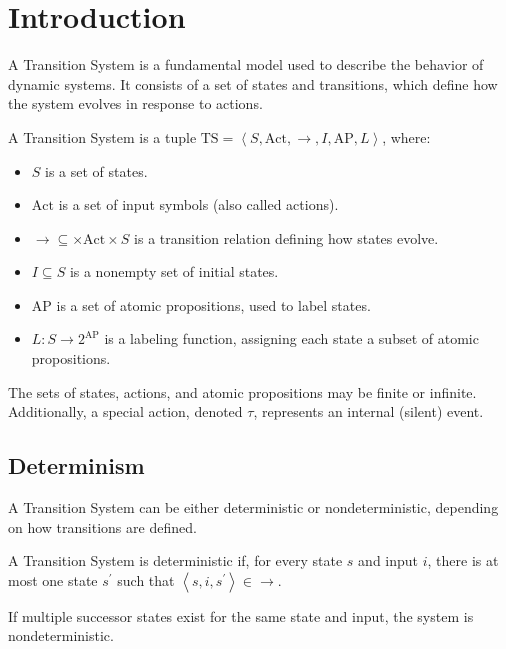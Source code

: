 \section{Introduction}

A Transition System is a fundamental model used to describe the behavior of dynamic systems. 
It consists of a set of states and transitions, which define how the system evolves in response to actions.
\begin{definition}
    A Transition System is a tuple $\text{TS}=\left\langle S, \text{Act}, \rightarrow, I,\text{AP}, L\right\rangle$, where:
    \begin{itemize}
        \item $S$ is a set of states.
        \item $\text{Act}$ is a set of input symbols (also called actions).
        \item $\rightarrow \subseteq \times \text{Act}\times S$ is a transition relation defining how states evolve.
        \item $I \subseteq S$ is a nonempty set of initial states.
        \item $\text{AP}$ is a set of atomic propositions, used to label states.
        \item $L: S \rightarrow 2^{\text{AP}}$ is a labeling function, assigning each state a subset of atomic propositions.
    \end{itemize}
\end{definition}
The sets of states, actions, and atomic propositions may be finite or infinite. 
Additionally, a special action, denoted $\tau$, represents an internal (silent) event.

\subsection{Determinism}
A Transition System can be either deterministic or nondeterministic, depending on how transitions are defined.
\begin{definition}
    A Transition System is deterministic if, for every state $s$ and input $i$, there is at most one state $s^\prime$ such that $\left\langle s, i, s^\prime\right\rangle \in\rightarrow$. 
\end{definition}
If multiple successor states exist for the same state and input, the system is nondeterministic.

